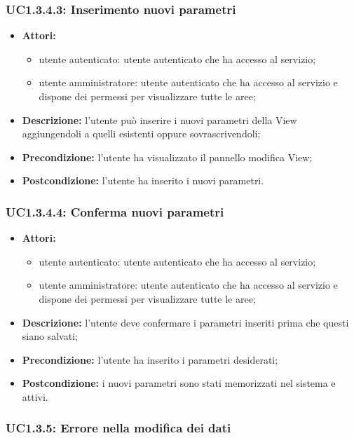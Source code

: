 \subsubsection{UC1.3.4.3: Inserimento nuovi parametri}

\begin{itemize}
    \item \textbf{Attori:}
    \begin{itemize}
    	\item utente autenticato: utente autenticato che ha accesso al servizio;
    	\item utente amministratore: utente autenticato che ha accesso al servizio e dispone dei permessi per visualizzare tutte le aree;
	\end{itemize}
    \item \textbf{Descrizione:} l'utente può inserire i nuovi parametri della View aggiungendoli a quelli esistenti oppure sovrascrivendoli;
    \item \textbf{Precondizione:} l'utente ha visualizzato il pannello modifica View;
    \item \textbf{Postcondizione:} l'utente ha inserito i nuovi parametri.
\end{itemize}

\subsubsection{UC1.3.4.4: Conferma nuovi parametri}

\begin{itemize}
    \item \textbf{Attori:}
    \begin{itemize}
    	\item utente autenticato: utente autenticato che ha accesso al servizio;
    	\item utente amministratore: utente autenticato che ha accesso al servizio e dispone dei permessi per visualizzare tutte le aree;
	\end{itemize}
    \item \textbf{Descrizione:} l'utente deve confermare i parametri inseriti prima che questi siano salvati;
    \item \textbf{Precondizione:} l'utente ha inserito i parametri desiderati;
    \item \textbf{Postcondizione:} i nuovi parametri sono stati memorizzati nel sistema e attivi.
\end{itemize}

\subsubsection{UC1.3.5: Errore nella modifica dei dati}

